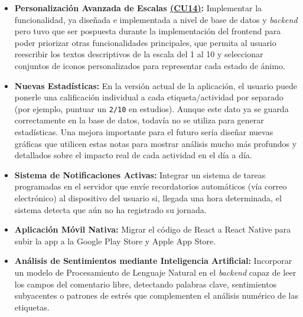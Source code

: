 \begin{itemize}
    \item \textbf{Personalización Avanzada de Escalas \hyperref[tab:esp_cu14]{(CU14)}:} Implementar la funcionalidad, ya diseñada e implementada a nivel de base de datos y \textit{backend} pero tuvo que ser pospuesta durante la implementación del frontend para poder priorizar otras funcionalidades principales, que permita al usuario reescribir los textos descriptivos de la escala del 1 al 10 y seleccionar conjuntos de iconos personalizados para representar cada estado de ánimo.
    \item \textbf{Nuevas Estadísticas:} En la versión actual de la aplicación, el usuario puede ponerle una calificación individual a cada etiqueta/actividad por separado (por ejemplo, puntuar un \texttt{2/10} en estudios). Aunque este dato ya se guarda correctamente en la base de datos, todavía no se utiliza para generar estadísticas. Una mejora importante para el futuro sería diseñar nuevas gráficas que utilicen estas notas para mostrar análisis mucho más profundos y detallados sobre el impacto real de cada actividad en el día a día.
    \item \textbf{Sistema de Notificaciones Activas:} Integrar un sistema de tareas programadas en el servidor que envíe recordatorios automáticos (vía correo electrónico) al dispositivo del usuario si, llegada una hora determinada, el sistema detecta que aún no ha registrado su jornada.
    \item \textbf{Aplicación Móvil Nativa:} Migrar el código de React a React Native para subir la app a la Google Play Store y Apple App Store.
    \item \textbf{Análisis de Sentimientos mediante Inteligencia Artificial:} Incorporar un modelo de Procesamiento de Lenguaje Natural en el \textit{backend} capaz de leer los campos del comentario libre, detectando palabras clave, sentimientos subyacentes o patrones de estrés que complementen el análisis numérico de las etiquetas.
\end{itemize}